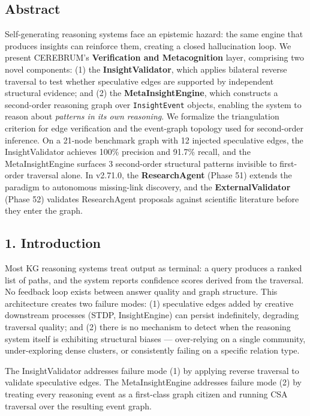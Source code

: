 
\subsection*{Abstract}
Self-generating reasoning systems face an epistemic hazard: the same engine that produces insights can reinforce them, creating a closed hallucination loop. We present CEREBRUM's \textbf{Verification and Metacognition} layer, comprising two novel components: (1) the \textbf{InsightValidator}, which applies bilateral reverse traversal to test whether speculative edges are supported by independent structural evidence; and (2) the \textbf{MetaInsightEngine}, which constructs a second-order reasoning graph over \texttt{InsightEvent} objects, enabling the system to reason about \textit{patterns in its own reasoning}. We formalize the triangulation criterion for edge verification and the event-graph topology used for second-order inference. On a 21-node benchmark graph with 12 injected speculative edges, the InsightValidator achieves 100\% precision and 91.7\% recall, and the MetaInsightEngine surfaces 3 second-order structural patterns invisible to first-order traversal alone. In v2.71.0, the \textbf{ResearchAgent} (Phase 51) extends the paradigm to autonomous missing-link discovery, and the \textbf{ExternalValidator} (Phase 52) validates ResearchAgent proposals against scientific literature before they enter the graph.

\subsection*{1. Introduction}
Most KG reasoning systems treat output as terminal: a query produces a ranked list of paths, and the system reports confidence scores derived from the traversal. No feedback loop exists between answer quality and graph structure. This architecture creates two failure modes: (1) speculative edges added by creative downstream processes (STDP, InsightEngine) can persist indefinitely, degrading traversal quality; and (2) there is no mechanism to detect when the reasoning system itself is exhibiting structural biases --- over-relying on a single community, under-exploring dense clusters, or consistently failing on a specific relation type.

The InsightValidator addresses failure mode (1) by applying reverse traversal to validate speculative edges. The MetaInsightEngine addresses failure mode (2) by treating every reasoning event as a first-class graph citizen and running CSA traversal over the resulting event graph.


